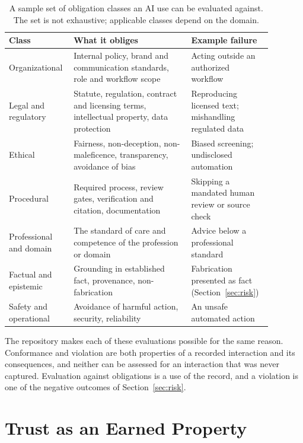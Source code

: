 \documentclass[11pt]{article}
\begin{document}
\begin{table}[t]
\centering
\small
\begin{tabular}{p{0.17\linewidth}p{0.42\linewidth}p{0.29\linewidth}}
\toprule
Class & What it obliges & Example failure \\
\midrule
Organizational & Internal policy, brand and communication standards, role and workflow scope & Acting outside an authorized workflow \\
Legal and regulatory & Statute, regulation, contract and licensing terms, intellectual property, data protection & Reproducing licensed text; mishandling regulated data \\
Ethical & Fairness, non-deception, non-maleficence, transparency, avoidance of bias & Biased screening; undisclosed automation \\
Procedural & Required process, review gates, verification and citation, documentation & Skipping a mandated human review or source check \\
Professional and domain & The standard of care and competence of the profession or domain & Advice below a professional standard \\
Factual and epistemic & Grounding in established fact, provenance, non-fabrication & Fabrication presented as fact (Section~\ref{sec:risk}) \\
Safety and operational & Avoidance of harmful action, security, reliability & An unsafe automated action \\
\bottomrule
\end{tabular}
\caption{A sample set of obligation classes an AI use can be evaluated against.
The set is not exhaustive; applicable classes depend on the domain.}
\label{tab:obligations}
\end{table}

The repository makes each of these evaluations possible for the same reason.
Conformance and violation are both properties of a recorded interaction and its
consequences, and neither can be assessed for an interaction that was never
captured. Evaluation against obligations is a use of the record, and a violation
is one of the negative outcomes of Section~\ref{sec:risk}.

\section{Trust as an Earned Property}
\label{sec:trust}
\end{document}
